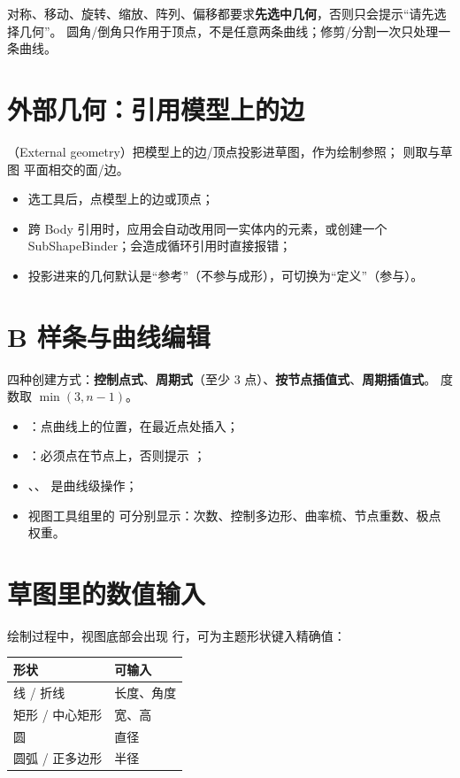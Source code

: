 \begin{warn}[这些工具都有前提]
对称、移动、旋转、缩放、阵列、偏移都要求\textbf{先选中几何}，否则只会提示“请先选择几何”。
圆角/倒角只作用于顶点，不是任意两条曲线；修剪/分割一次只处理一条曲线。
\end{warn}

\section{外部几何：引用模型上的边}

（External geometry）把模型上的边/顶点投影进草图，作为绘制参照； 则取与草图
平面相交的面/边。

\begin{itemize}
  \item 选工具后，点模型上的边或顶点；
  \item 跨 Body 引用时，应用会自动改用同一实体内的元素，或创建一个 SubShapeBinder；会造成循环引用时直接报错；
  \item 投影进来的几何默认是“参考”（不参与成形），可切换为“定义”（参与）。
\end{itemize}

\section{B 样条与曲线编辑}

四种创建方式：\textbf{控制点式}、\textbf{周期式}（至少 3 点）、\textbf{按节点插值式}、\textbf{周期插值式}。
度数取 $\min(3, n-1)$。

\begin{itemize}
  \item {}：点曲线上的位置，在最近点处插入；
  \item {}：必须点在节点上，否则提示 ；
  \item {}、、 是曲线级操作；
  \item 视图工具组里的  可分别显示：次数、控制多边形、曲率梳、节点重数、极点权重。
\end{itemize}

\section{草图里的数值输入}

绘制过程中，视图底部会出现  行，可为主题形状键入精确值：

\begin{center}
\small
\begin{tabularx}{\linewidth}{@{}lX@{}}
\toprule
\textbf{形状} & \textbf{可输入} \\
\midrule
线 / 折线 & 长度、角度 \\
矩形 / 中心矩形 & 宽、高 \\
圆 & 直径 \\
圆弧 / 正多边形 & 半径 \\
\bottomrule
\end{tabularx}
\end{center}

